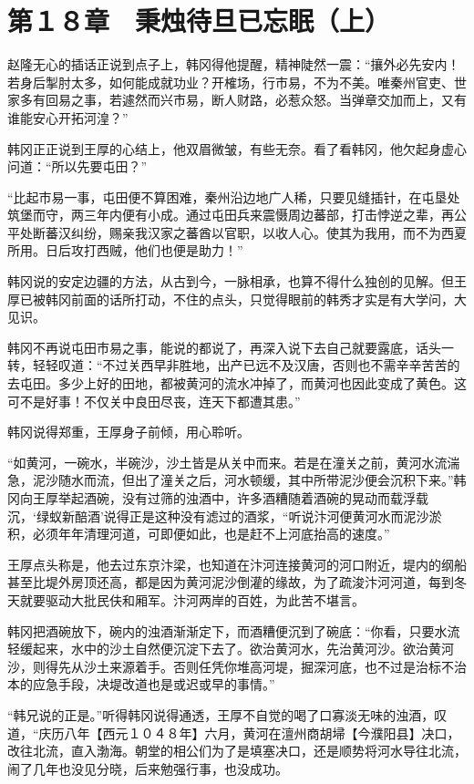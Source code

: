 \section{第１８章　秉烛待旦已忘眠（上）}

赵隆无心的插话正说到点子上，韩冈得他提醒，精神陡然一震：“攘外必先安内！若身后掣肘太多，如何能成就功业？开榷场，行市易，不为不美。唯秦州官吏、世家多有回易之事，若遽然而兴市易，断人财路，必惹众怒。当弹章交加而上，又有谁能安心开拓河湟？”

韩冈正正说到王厚的心结上，他双眉微皱，有些无奈。看了看韩冈，他欠起身虚心问道：“所以先要屯田？”

“比起市易一事，屯田便不算困难，秦州沿边地广人稀，只要见缝插针，在屯垦处筑堡而守，两三年内便有小成。通过屯田兵来震慑周边蕃部，打击悖逆之辈，再公平处断蕃汉纠纷，赐亲我汉家之蕃酋以官职，以收人心。使其为我用，而不为西夏所用。日后攻打西贼，他们也便是助力！”

韩冈说的安定边疆的方法，从古到今，一脉相承，也算不得什么独创的见解。但王厚已被韩冈前面的话所打动，不住的点头，只觉得眼前的韩秀才实是有大学问，大见识。

韩冈不再说屯田市易之事，能说的都说了，再深入说下去自己就要露底，话头一转，轻轻叹道：“不过关西早非胜地，出产已远不及汉唐，否则也不需辛辛苦苦的去屯田。多少上好的田地，都被黄河的流水冲掉了，而黄河也因此变成了黄色。这可不是好事！不仅关中良田尽丧，连天下都遭其患。”

韩冈说得郑重，王厚身子前倾，用心聆听。

“如黄河，一碗水，半碗沙，沙土皆是从关中而来。若是在潼关之前，黄河水流湍急，泥沙随水而流，但出了潼关之后，河水顿缓，其中所带泥沙便会沉积下来。”韩冈向王厚举起酒碗，没有过筛的浊酒中，许多酒糟随着酒碗的晃动而载浮载沉，‘绿蚁新醅酒’说得正是这种没有滤过的酒浆，“听说汴河便黄河水而泥沙淤积，必须年年清理河道，可即便如此，也是赶不上河底抬高的速度。”

王厚点头称是，他去过东京汴梁，也知道在汴河连接黄河的河口附近，堤内的纲船甚至比堤外房顶还高，都是因为黄河泥沙倒灌的缘故，为了疏浚汴河河道，每到冬天就要驱动大批民伕和厢军。汴河两岸的百姓，为此苦不堪言。

韩冈把酒碗放下，碗内的浊酒渐渐定下，而酒糟便沉到了碗底：“你看，只要水流轻缓起来，水中的沙土自然便沉淀下去了。欲治黄河水，先治黄河沙。欲治黄河沙，则得先从沙土来源着手。否则任凭你堆高河堤，掘深河底，也不过是治标不治本的应急手段，决堤改道也是或迟或早的事情。”

“韩兄说的正是。”听得韩冈说得通透，王厚不自觉的喝了口寡淡无味的浊酒，叹道，“庆历八年【西元１０４８年】六月，黄河在澶州商胡埽【今濮阳县】决口，改往北流，直入渤海。朝堂的相公们为了是填塞决口，还是顺势将河水导往北流，闹了几年也没见分晓，后来勉强行事，也没成功。

